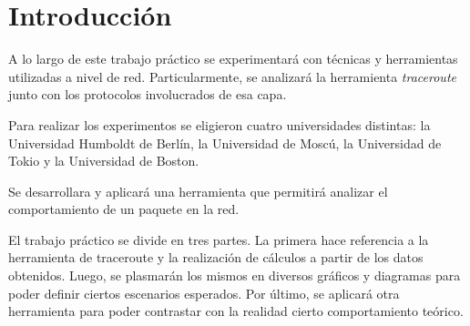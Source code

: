 \section{Introducción}

A lo largo de este trabajo práctico se experimentará con técnicas
y herramientas utilizadas a nivel de red. Particularmente, se analizará
la herramienta \textit{traceroute} junto con los protocolos involucrados de esa capa. 

Para realizar los experimentos se eligieron cuatro universidades distintas: la Universidad Humboldt de Berlín, la Universidad de Moscú,
la Universidad de Tokio y la Universidad de Boston.

Se desarrollara y aplicará una herramienta que permitirá analizar el comportamiento de un paquete en la red. 

El trabajo práctico se divide en tres partes. La primera hace referencia a la herramienta de traceroute y la realización de cálculos a partir de los datos obtenidos. Luego, se plasmarán los mismos en diversos gráficos y diagramas para poder definir ciertos escenarios esperados. Por último, se aplicará otra herramienta para poder contrastar con la realidad cierto comportamiento teórico. 
